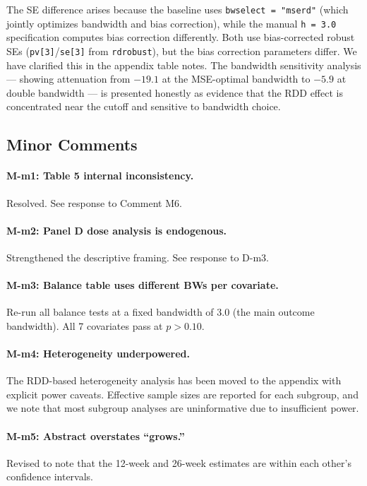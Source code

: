 \documentclass[12pt]{article}
\newcommand{\resp}[1]{\textcolor{response}{#1}}
\begin{document}
\resp{The SE difference arises because the baseline uses \texttt{bwselect = "mserd"} (which jointly optimizes bandwidth and bias correction), while the manual \texttt{h = 3.0} specification computes bias correction differently. Both use bias-corrected robust SEs (\texttt{pv[3]}/\texttt{se[3]} from \texttt{rdrobust}), but the bias correction parameters differ. We have clarified this in the appendix table notes. The bandwidth sensitivity analysis --- showing attenuation from $-19.1$ at the MSE-optimal bandwidth to $-5.9$ at double bandwidth --- is presented honestly as evidence that the RDD effect is concentrated near the cutoff and sensitive to bandwidth choice.}

\subsection*{Minor Comments}

\paragraph{M-m1: Table 5 internal inconsistency.}
\resp{Resolved. See response to Comment M6.}

\paragraph{M-m2: Panel D dose analysis is endogenous.}
\resp{Strengthened the descriptive framing. See response to D-m3.}

\paragraph{M-m3: Balance table uses different BWs per covariate.}
\resp{Re-run all balance tests at a fixed bandwidth of 3.0 (the main outcome bandwidth). All 7 covariates pass at $p > 0.10$.}

\paragraph{M-m4: Heterogeneity underpowered.}
\resp{The RDD-based heterogeneity analysis has been moved to the appendix with explicit power caveats. Effective sample sizes are reported for each subgroup, and we note that most subgroup analyses are uninformative due to insufficient power.}

\paragraph{M-m5: Abstract overstates ``grows.''}
\resp{Revised to note that the 12-week and 26-week estimates are within each other's confidence intervals.}
\end{document}
